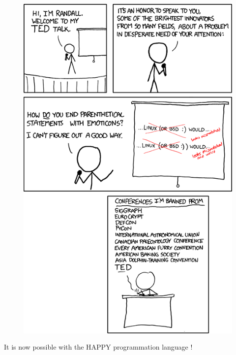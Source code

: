 \documentclass[11pt,a4paper]{article}
\begin{document}

\newpage

\begin{figure}[h!]
\begin{center}
\includegraphics[scale=0.65]{xkcd.png}
\end{center}
\end{figure}
It is now possible with the HAPPY programmation language !
\newpage








\end{document}
